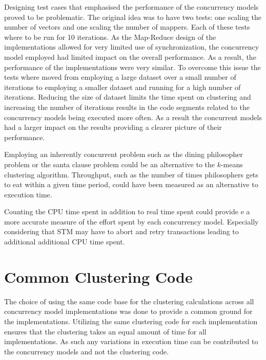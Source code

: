 Designing test cases that emphasised the performance of the concurrency models proved to be problematic. The original idea was to have two tests: one scaling the number of vectors and one scaling the number of mappers. Each of these tests where to be run for 10 iterations. As the Map-Reduce design of the implementations allowed for very limited use of synchronization, the concurrency model employed had limited impact on the overall performance. As a result, the performance of the implementations were very similar. To overcome this issue the tests where moved from employing a large dataset over a small number of iterations to employing a smaller dataset and running for a high number of iterations. Reducing the size of dataset limits the time spent on clustering and increasing the number of iterations results in the code segments related to the concurrency models being executed more often. As a result the concurrent models had a larger impact on the results providing a clearer picture of their performance.

Employing an inherently concurrent problem such as the dining philosopher problem\cite[p. 673]{hoare1978communicating} or the santa clause problem\cite{trono1994new} could be an alternative to the $k$-means clustering algorithm. Throughput, such as the number of times philosophers gets to eat within a given time period, could have been measured as an alternative to execution time.

Counting the CPU time spent in addition to real time spent could provide e a more accurate measure of the effort spent by each concurrency model. Especially considering that \ac{STM} may have to abort and retry transactions leading to additional additional CPU time spent.

\section{Common Clustering Code}
The choice of using the same code base for the clustering calculations across all concurrency model implementations was done to provide a common ground for the implementations. Utilizing the same clustering code for each implementation ensures that the clustering takes an equal amount of time for all implementations. As such any variations in execution time can be contributed to the concurrency models and not the clustering code. 


